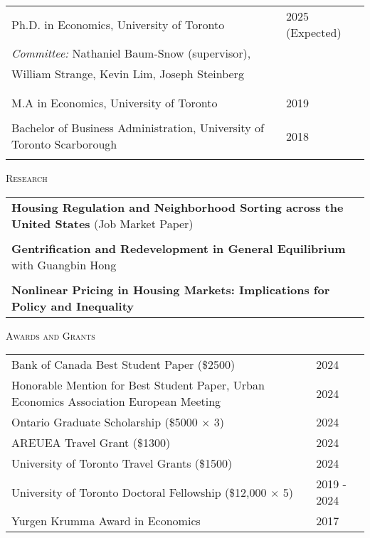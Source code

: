 \documentclass[11pt]{amsart}
\begin{document}
\normalsize
\begin{tabular}{ p{12.5cm}  p{5cm}}
  \large{Ph.D. in Economics, University of Toronto}  & 2025 (Expected) \\
   \multicolumn{2}{l}{ \hspace{.75cm}  \emph{Committee:}  Nathaniel Baum-Snow (supervisor), } \\
     \hspace{2.8cm}  William Strange, Kevin Lim, Joseph Steinberg  \\
 \hspace{2.90cm}   \\
  \\
  \large{M.A in Economics, University of Toronto}    & 2019            \\
   \\
  \large{Bachelor of Business Administration, University of Toronto Scarborough}   & 2018            \\
                                                     &                 
\end{tabular}

\vspace{0.4cm}




\LARGE
\textsc{Research}
\vspace{0.2cm}
\normalsize

\begin{tabular}{ p{15.5cm}}
 \textbf{Housing Regulation and Neighborhood Sorting across the United States} (Job Market Paper)                         \\

\\
 \textbf{Gentrification and Redevelopment in General Equilibrium}  with Guangbin Hong \\
\\
\textbf{Nonlinear Pricing in Housing Markets: Implications for Policy and Inequality} 
\normalsize
\end{tabular}

\vspace{0.4cm}

\LARGE
\textsc{Awards and Grants}
\vspace{0.2cm}


\normalsize 
\begin{tabular}{ p{12.5cm}  p{5cm}}
  Bank of Canada Best Student Paper (\$2500) & 2024 \\
  Honorable Mention for Best Student Paper, Urban Economics Association European Meeting & 2024\\
  Ontario Graduate Scholarship (\$5000 $\times$ 3) & 2024 \\
  AREUEA Travel Grant (\$1300)    & 2024         \\
  University of Toronto Travel Grants (\$1500) & 2024 \\
  University of Toronto Doctoral Fellowship  (\$12,000 $ \times$ 5)  & 2019 - 2024  \\
  Yurgen Krumma Award in Economics & 2017
\end{tabular}
\end{document}
